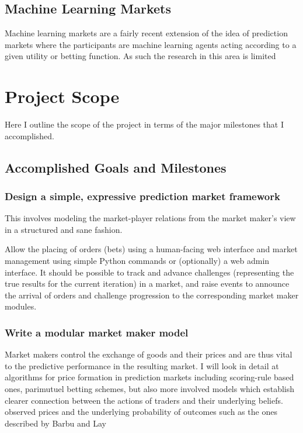 \documentclass[bsc,frontabs,twoside,singlespacing,parskip,deptreport]{infthesis}     %
\begin{document}
\section{Machine Learning Markets}
	Machine learning markets are a fairly recent extension of the idea of prediction markets where the participants are machine learning agents acting according to a given utility or betting function. As such the research in this area is limited

\chapter{Project Scope}
	Here I outline the scope of the project in terms of the major milestones that I accomplished. 



\section{Accomplished Goals and Milestones}	

\subsection{Design a simple, expressive prediction market framework}
	This involves modeling the market-player relations from the market maker’s view in a structured and sane fashion. 

Allow the placing of orders (bets) using a human-facing web interface and market management using simple Python commands or (optionally) a web admin interface. It should be possible to track and advance challenges (representing the true results for the current iteration) in a market, and raise events to announce the arrival of orders and challenge progression to the corresponding market maker modules. 

\subsection{Write a modular market maker model}

Market makers control the exchange of goods and their prices and are thus vital to the predictive performance in the resulting market. I will look in detail at algorithms for price formation in prediction markets including scoring-rule based ones, parimutuel betting schemes, but also more involved models which establish clearer connection between the actions of traders and their underlying beliefs. observed prices and the underlying probability of outcomes such as the ones described by Barbu and Lay 
\end{document}
